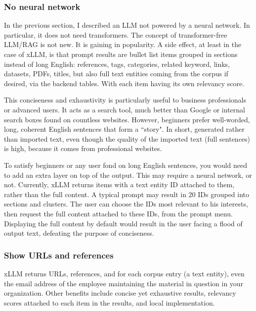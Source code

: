 \documentclass[10pt]{article}
\begin{document}
{\subsubsection{No neural network}\label{nonndnn}
In the previous section, I described an LLM not powered by a neural network. In particular, it does not need transformers. The concept of transformer-free LLM/RAG is not new. It is gaining in popularity. A side effect, at least in the case of xLLM, is that prompt results are bullet list items grouped in sections instead of long English: references, tags, categories, related keyword, links, datasets, PDFs, titles, but also full text entities coming from the corpus if desired, via the backend tables. 
With each item having its own \textcolor{index}{relevancy score}.

This conciseness and \textcolor{index}{exhaustivity} is particularly useful to business professionals or advanced users. It acts as a search tool, much better than Google or internal search boxes found on countless websites. However, beginners prefer well-worded, long, coherent English sentences that form a ``story". In short, generated rather than imported text, even though the quality of the imported text (full sentences) is high, because it comes from professional websites.

To satisfy beginners or any user fond on long English sentences, you would need to add an extra layer on top of the output. This may require a neural network, or not. Currently, xLLM returns items with a text entity ID attached to them, rather than the full content. A typical prompt may result in 20 IDs grouped into sections and clusters. The user can choose the IDs most relevant to his interests, then request the full content attached to these IDs, from the prompt menu. Displaying the full content by default would result in the user facing a flood of output text, defeating the purpose of conciseness.


\subsubsection{Show URLs and references}
xLLM returns URLs, references, and for each corpus entry (a text entity), even the email address of the employee maintaining the material in question in your organization. Other benefits include concise yet exhaustive results, relevancy scores attached to each item in the results, and local implementation.

}
\end{document}
